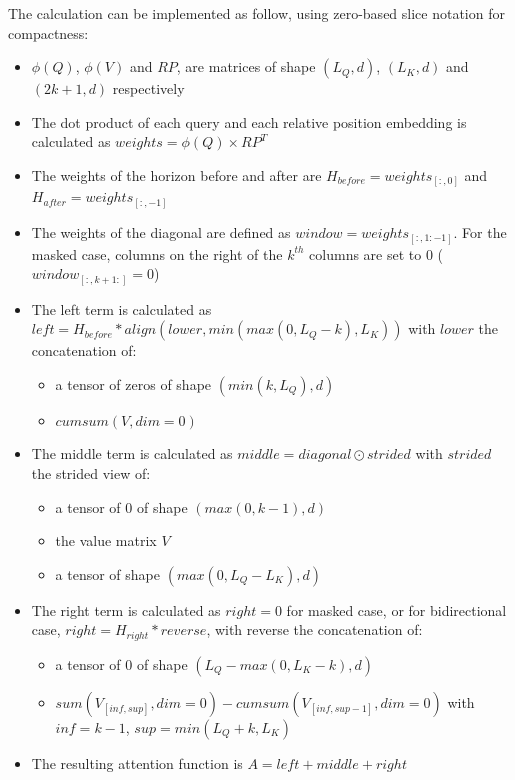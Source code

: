The calculation can be implemented as follow, using zero-based slice
notation for compactness:

\begin{itemize}
\tightlist
\item
  \(\phi(Q)\), \(\phi(V)\) and \(RP\), are matrices of shape
  \((L_Q, d)\), \((L_K, d)\) and \((2k+1, d)\) respectively
\item
  The dot product of each query and each relative position embedding is
  calculated as \(weights = \phi(Q) \times RP^T\)
\item
  The weights of the horizon before and after are
  \(H_{before} = weights_{[:, 0]}\) and
  \(H_{after} = weights_{[:, -1]}\)
\item
  The weights of the diagonal are defined as
  \(window = weights_{[:,1:-1]}\). For the masked case, columns on the
  right of the \(k^{th}\) columns are set to 0
  (\(window_{[:, k+1:]} = 0\))
\item
  The left term is calculated as
  \(left = H_{before} * align(lower, min(max(0, L_Q-k), L_K))\) with
  \(lower\) the concatenation of:

  \begin{itemize}
  \tightlist
  \item
    a tensor of zeros of shape \(\left(min(k, L_Q), d\right)\)
  \item
    \(cumsum(V, dim=0)\)
  \end{itemize}
\item
  The middle term is calculated as \(middle = diagonal \odot strided\)
  with \(strided\) the strided view of:

  \begin{itemize}
  \tightlist
  \item
    a tensor of 0 of shape \((max(0, k-1), d)\)
  \item
    the value matrix \(V\)
  \item
    a tensor of shape \((max(0, L_Q-L_K), d)\)
  \end{itemize}
\item
  The right term is calculated as \(right = 0\) for masked case, or for
  bidirectional case, \(right = H_{right} * reverse\), with reverse the
  concatenation of:

  \begin{itemize}
  \tightlist
  \item
    a tensor of 0 of shape \((L_Q-max(0, L_K-k), d)\)
  \item
    \(sum(V_{[inf, sup]}, dim=0) - cumsum(V_{[inf, sup-1]}, dim=0)\)
    with \(inf = k-1\), \(sup = min(L_Q+k, L_K)\)
  \end{itemize}
\item
  The resulting attention function is \(A = left + middle + right\)
\end{itemize}

